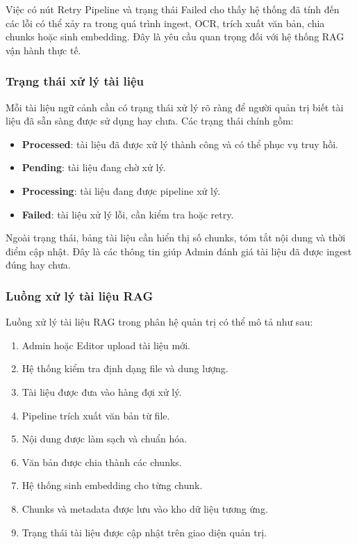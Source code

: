 Việc có nút Retry Pipeline và trạng thái Failed cho thấy hệ thống đã tính đến các lỗi có thể xảy ra trong quá trình ingest, OCR, trích xuất văn bản, chia chunks hoặc sinh embedding. Đây là yêu cầu quan trọng đối với hệ thống RAG vận hành thực tế.

\subsubsection{Trạng thái xử lý tài liệu}

Mỗi tài liệu ngữ cảnh cần có trạng thái xử lý rõ ràng để người quản trị biết tài liệu đã sẵn sàng được sử dụng hay chưa. Các trạng thái chính gồm:

\begin{itemize}
    \item \textbf{Processed}: tài liệu đã được xử lý thành công và có thể phục vụ truy hồi.
    \item \textbf{Pending}: tài liệu đang chờ xử lý.
    \item \textbf{Processing}: tài liệu đang được pipeline xử lý.
    \item \textbf{Failed}: tài liệu xử lý lỗi, cần kiểm tra hoặc retry.
\end{itemize}

Ngoài trạng thái, bảng tài liệu cần hiển thị số chunks, tóm tắt nội dung và thời điểm cập nhật. Đây là các thông tin giúp Admin đánh giá tài liệu đã được ingest đúng hay chưa.

\subsubsection{Luồng xử lý tài liệu RAG}

Luồng xử lý tài liệu RAG trong phân hệ quản trị có thể mô tả như sau:

\begin{enumerate}
    \item Admin hoặc Editor upload tài liệu mới.
    \item Hệ thống kiểm tra định dạng file và dung lượng.
    \item Tài liệu được đưa vào hàng đợi xử lý.
    \item Pipeline trích xuất văn bản từ file.
    \item Nội dung được làm sạch và chuẩn hóa.
    \item Văn bản được chia thành các chunks.
    \item Hệ thống sinh embedding cho từng chunk.
    \item Chunks và metadata được lưu vào kho dữ liệu tương ứng.
    \item Trạng thái tài liệu được cập nhật trên giao diện quản trị.
\end{enumerate}

